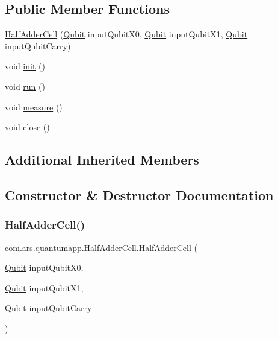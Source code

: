 \subsection*{Public Member Functions}
\begin{DoxyCompactItemize}
\item 
\hyperlink{classcom_1_1ars_1_1quantumapp_1_1_half_adder_cell_a9a5d3990c9d64a2480b990f2f32e86ed}{Half\+Adder\+Cell} (\hyperlink{classcom_1_1ars_1_1qubits_1_1_qubit}{Qubit} input\+Qubit\+X0, \hyperlink{classcom_1_1ars_1_1qubits_1_1_qubit}{Qubit} input\+Qubit\+X1, \hyperlink{classcom_1_1ars_1_1qubits_1_1_qubit}{Qubit} input\+Qubit\+Carry)
\item 
void \hyperlink{classcom_1_1ars_1_1quantumapp_1_1_half_adder_cell_a077ff8604fb9f4b2043ab4264327f4b4}{init} ()
\item 
void \hyperlink{classcom_1_1ars_1_1quantumapp_1_1_half_adder_cell_a2b0fc8424cf7d70048942436a3933917}{run} ()
\item 
void \hyperlink{classcom_1_1ars_1_1quantumapp_1_1_half_adder_cell_a534b92e8e8fd9cbc2538a4e86311b3aa}{measure} ()
\item 
void \hyperlink{classcom_1_1ars_1_1quantumapp_1_1_half_adder_cell_a9ce49c4de6b6267d794c9543e185e976}{close} ()
\end{DoxyCompactItemize}
\subsection*{Additional Inherited Members}


\subsection{Constructor \& Destructor Documentation}
\hypertarget{classcom_1_1ars_1_1quantumapp_1_1_half_adder_cell_a9a5d3990c9d64a2480b990f2f32e86ed}{}\label{classcom_1_1ars_1_1quantumapp_1_1_half_adder_cell_a9a5d3990c9d64a2480b990f2f32e86ed} 
\subsubsection{\texorpdfstring{Half\+Adder\+Cell()}{HalfAdderCell()}}
{\footnotesize\ttfamily com.\+ars.\+quantumapp.\+Half\+Adder\+Cell.\+Half\+Adder\+Cell (\begin{DoxyParamCaption}\item[{\hyperlink{classcom_1_1ars_1_1qubits_1_1_qubit}{Qubit}}]{input\+Qubit\+X0,  }\item[{\hyperlink{classcom_1_1ars_1_1qubits_1_1_qubit}{Qubit}}]{input\+Qubit\+X1,  }\item[{\hyperlink{classcom_1_1ars_1_1qubits_1_1_qubit}{Qubit}}]{input\+Qubit\+Carry }\end{DoxyParamCaption})}



